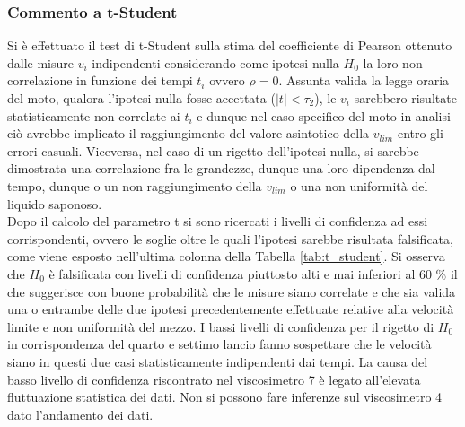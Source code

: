 \documentclass[a4paper,11pt,oneside]{article}
\begin{document}
\subsubsection*{Commento a t-Student} %
Si è effettuato il test di t-Student sulla stima del coefficiente di Pearson ottenuto dalle misure $v_{i}$ indipendenti considerando come ipotesi nulla $H_{0}$ la loro non-correlazione in funzione dei tempi $t_{i}$ ovvero $\rho=0$.
Assunta valida la legge oraria del moto, qualora l'ipotesi nulla fosse accettata ($|t| < \tau_{2}$), le $v_{i}$ sarebbero risultate statisticamente non-correlate ai $t_{i}$ e dunque nel caso specifico del moto in analisi ciò avrebbe implicato il raggiungimento del valore asintotico della $v_{lim}$ entro gli errori casuali. Viceversa, nel caso di un rigetto dell'ipotesi nulla, si sarebbe dimostrata una correlazione fra le grandezze, dunque una loro dipendenza dal tempo, dunque o un non raggiungimento della $v_{lim}$ o una non uniformità del liquido saponoso.\\
Dopo il calcolo del parametro t si sono ricercati i livelli di confidenza ad essi corrispondenti, ovvero le soglie oltre le quali l'ipotesi sarebbe risultata falsificata, come viene esposto nell'ultima colonna della Tabella \ref{tab:t_student}.
Si osserva che $H_{0}$ è falsificata con livelli di confidenza piuttosto alti e mai inferiori al 60 \% il che suggerisce con buone probabilità che le misure siano correlate e che sia valida una o entrambe delle due ipotesi precedentemente effettuate relative alla velocità limite e non uniformità del mezzo.\newline
I bassi livelli di confidenza per il rigetto di $H_{0}$ in corrispondenza del quarto e settimo lancio fanno sospettare che le velocità siano in questi due casi statisticamente indipendenti dai tempi. La causa del basso livello di confidenza riscontrato nel viscosimetro 7 è legato all'elevata fluttuazione statistica dei dati. Non si possono fare inferenze sul viscosimetro 4 dato l'andamento dei dati.
\end{document}
